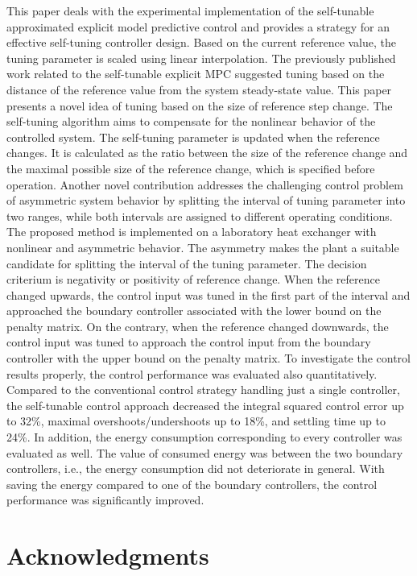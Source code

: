 \documentclass[preprint,12pt]{elsarticle}
\begin{document}
	This paper deals with the experimental implementation of the self-tunable approximated explicit model predictive control and provides a strategy for an effective self-tuning controller design. Based on the current reference value, the tuning parameter is scaled using linear interpolation. The previously published work related to the self-tunable explicit MPC suggested tuning based on the distance of the reference value from the system steady-state value. This paper presents a novel idea of tuning based on the size of reference step change. The self-tuning algorithm aims to compensate for the nonlinear behavior of the controlled system. The self-tuning parameter is updated when the reference changes. It is calculated as the ratio between the size of the reference change and the maximal possible size of the reference change, which is specified before operation. 
	Another novel contribution addresses the challenging control problem of asymmetric system behavior by splitting the interval of tuning parameter into two ranges, while both intervals are assigned to different operating conditions. The proposed method is implemented on a laboratory heat exchanger with nonlinear and asymmetric behavior. The asymmetry makes the plant a suitable candidate for splitting the interval of the tuning parameter. The decision criterium is negativity or positivity of reference change. When the reference changed upwards, the control input was tuned in the first part of the interval and approached the boundary controller associated with the lower bound on the penalty matrix. On the contrary, when the reference changed downwards, the control input was tuned to approach the control input from the boundary controller with the upper bound on the penalty matrix. To investigate the control results properly, the control performance was evaluated also quantitatively. Compared to the conventional control strategy handling just a single controller, the self-tunable control approach decreased the integral squared control error up to 32\%, maximal overshoots/undershoots up to 18\%, and settling time up to 24\%. In addition, the energy consumption corresponding to every controller was evaluated as well. The value of consumed energy was between the two boundary controllers, i.e., the energy consumption did not deteriorate in general. With saving the energy compared to one of the boundary controllers, the control performance was significantly improved. 
	
	\section*{Acknowledgments}
	
\end{document}
